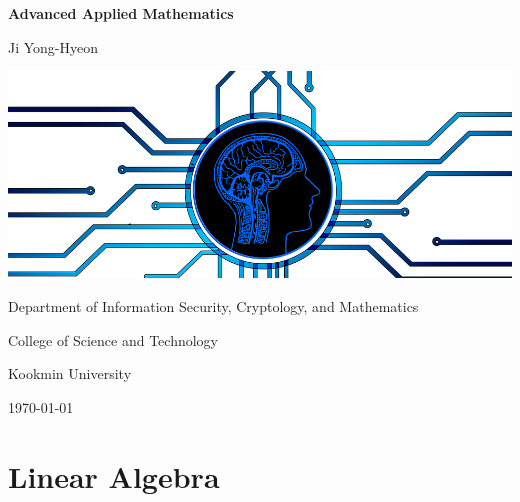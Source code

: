 \documentclass[12pt,openany]{book}
\theoremstyle{definition}
\begin{document}
	
	\begin{titlepage}
		\begin{center}
			{\Huge\textsf{\textbf{Advanced Applied Mathematics}}\par}
			\vspace{0.5in}
			{\Large Ji Yong-Hyeon\par}
			\vspace{1in}
			\includegraphics[scale=.5]{aam.png}\par
			\vspace{1in}
			{Department of Information Security, Cryptology, and Mathematics\par}
			{College of Science and Technology\par}
			{Kookmin University\par}
			\vspace{.25in}
			{\large \today\par}
		\end{center}
	\end{titlepage}
	
	\tableofcontents
	
	\mainmatter
	
	\chapter{Linear Algebra}
\end{document}
